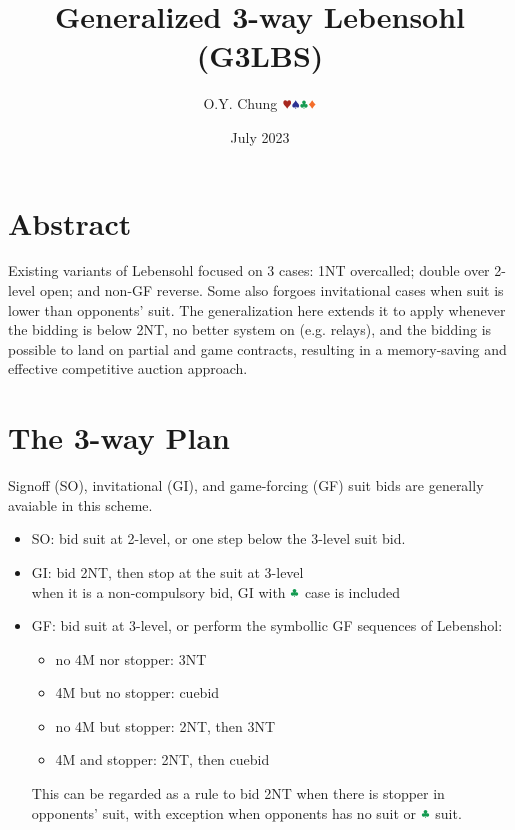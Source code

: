 \documentclass{article}
\title{Generalized 3-way Lebensohl (G3LBS)}
\author{O.Y. Chung $\hhh\sss\ccc\ddd$}
\date{July 2023}
\newcommand*{\ccc}{\textcolor{ForestGreen}{\clubsuit}}
\begin{document}
\begin{CJK*}{UTF8}{gbsn}
\end{CJK*}
\maketitle

\begin{multicols}{2}

\section{Abstract}
Existing variants of Lebensohl focused on 3 cases: 1NT overcalled; double over 2-level open; and non-GF reverse. Some also forgoes invitational cases when suit is lower than opponents' suit. The generalization here extends it to apply whenever the bidding is below 2NT, no better system on (e.g. relays), and the bidding is possible to land on partial and game contracts, resulting in a memory-saving and effective competitive auction approach.

\section{The 3-way Plan}
Signoff (SO), invitational (GI), and game-forcing (GF) suit bids are generally avaiable in this scheme.

\begin{itemize}
    \item SO: bid suit at 2-level, or one step below the 3-level suit bid.
    \item GI: bid 2NT, then stop at the suit at 3-level \\
    when it is a non-compulsory bid, GI with $\ccc$ case is included
    \item GF: bid suit at 3-level, or perform the symbollic GF sequences of Lebenshol:
    \begin{itemize}
        \item no 4M nor stopper: 3NT
        \item 4M but no stopper: cuebid
        \item no 4M but stopper: 2NT, then 3NT
        \item 4M and stopper: 2NT, then cuebid
    \end{itemize}
    This can be regarded as a rule to bid 2NT when there is stopper in opponents' suit, with exception when opponents has no suit or $\ccc$ suit.
\end{itemize}


\end{multicols}
\end{document}
